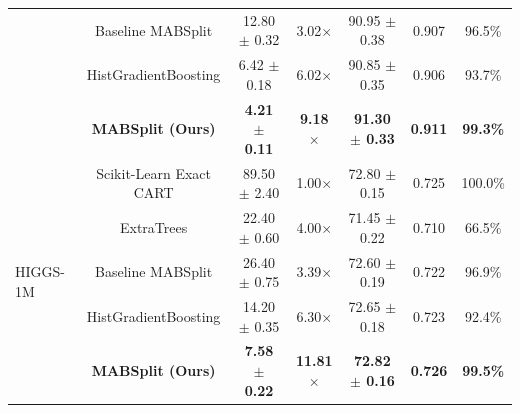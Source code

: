 \begin{table}[htbp]
{\begin{tabular}{lcccccc}
 & Baseline MABSplit \cite{tiwari2022mabsplit} & 12.80 $\pm$ 0.32 & 3.02$\times$ & 90.95 $\pm$ 0.38 & 0.907 & 96.5\% \\
 & HistGradientBoosting \cite{ke2017lightgbm} & 6.42 $\pm$ 0.18 & 6.02$\times$ & 90.85 $\pm$ 0.35 & 0.906 & 93.7\% \\
 & \textbf{MABSplit (Ours)} & \textbf{4.21 $\pm$ 0.11} & \textbf{9.18$\times$} & \textbf{91.30 $\pm$ 0.33} & \textbf{0.911} & \textbf{99.3\%} \\
\midrule
\multirow{5}{*}{HIGGS-1M} 
 & Scikit-Learn Exact CART \cite{breiman1984classification} & 89.50 $\pm$ 2.40 & 1.00$\times$ & 72.80 $\pm$ 0.15 & 0.725 & 100.0\% \\
 & ExtraTrees \cite{geurts2006extremely} & 22.40 $\pm$ 0.60 & 4.00$\times$ & 71.45 $\pm$ 0.22 & 0.710 & 66.5\% \\
 & Baseline MABSplit \cite{tiwari2022mabsplit} & 26.40 $\pm$ 0.75 & 3.39$\times$ & 72.60 $\pm$ 0.19 & 0.722 & 96.9\% \\
 & HistGradientBoosting \cite{ke2017lightgbm} & 14.20 $\pm$ 0.35 & 6.30$\times$ & 72.65 $\pm$ 0.18 & 0.723 & 92.4\% \\
 & \textbf{MABSplit (Ours)} & \textbf{7.58 $\pm$ 0.22} & \textbf{11.81$\times$} & \textbf{72.82 $\pm$ 0.16} & \textbf{0.726} & \textbf{99.5\%} \\
\bottomrule
\end{tabular}%
}
\end{table}
